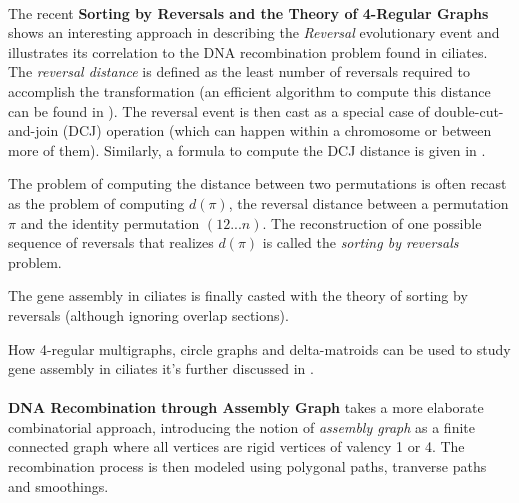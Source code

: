 \paragraph{}
The recent \textbf{Sorting by Reversals and the Theory of 4-Regular Graphs} \cite{DBLP:journals/corr/Brijder17} shows an interesting approach in describing the \textit{Reversal} evolutionary event and illustrates its correlation to the DNA recombination problem found in ciliates. The \textit{reversal distance} is defined as the least number of reversals required to accomplish the transformation (an efficient algorithm to compute this distance can be found in \cite{Hannenhalli}). The reversal event is then cast as a special case of double-cut-and-join (DCJ) operation (which can happen within a chromosome or between more of them). Similarly, a formula to compute the DCJ distance is given in \cite{Bergeron2006}.

The problem of computing the distance between two permutations is often recast as the problem of computing $d(\pi)$, the reversal distance between a permutation $\pi$ and the identity permutation $(1 2 ... n)$. The reconstruction of one possible sequence of reversals that realizes $d(\pi)$ is called the \textit{sorting by reversals} problem.

The gene assembly in ciliates is finally casted with the theory of sorting by reversals (although ignoring overlap sections).

How 4-regular multigraphs, circle graphs and delta-matroids can be used to study gene assembly in ciliates it's further discussed in \cite{Brijder2014}.

\paragraph{}
\textbf{DNA Recombination through Assembly Graph}\cite{ANGELESKA20093020} takes a more elaborate combinatorial approach, introducing the notion of \textit{assembly graph} as a finite connected graph where all vertices are rigid vertices of valency 1 or 4. The recombination process is then modeled using polygonal paths, tranverse paths and smoothings.